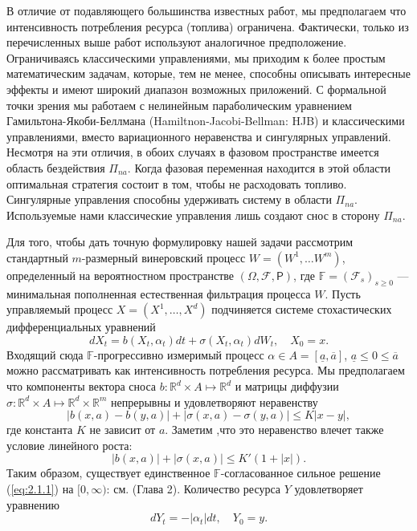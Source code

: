 В отличие от подавляющего большинства известных работ, мы предполагаем что интенсивность потребления ресурса (топлива) ограничена. Фактически, только \cite{PemZhaYin07,BiaWuZhe14} из перечисленных выше работ используют аналогичное предположение. Ограничиваясь классическими управлениями, мы приходим к более простым математическим задачам, которые, тем не менее, способны описывать интересные эффекты и имеют широкий диапазон возможных приложений. С формальной точки зрения мы работаем с нелинейным параболическим уравнением Гамильтона-Якоби-Беллмана (Hamiltnon-Jacobi-Bellman: HJB) и классическими управлениями, вместо вариационного неравенства и сингулярных управлений. Несмотря на эти отличия, в обоих случаях в фазовом пространстве имеется область бездействия $\Pi_{na}$. Когда фазовая переменная находится в этой области оптимальная стратегия состоит в том, чтобы не расходовать топливо. Сингулярные управления способны удерживать систему в области $\Pi_{na}$. Используемые нами классические управления лишь создают снос в сторону $\Pi_{na}$.

Для того, чтобы дать точную формулировку нашей задачи рассмотрим стандартный $m$-размерный винеровский процесс  $W=(W^1,\dots W^m)$, определенный на вероятностном пространстве $(\Omega,\mathcal F,\mathsf P)$, где $\mathbb F=(\mathscr F_s)_{s\ge 0}$ --- минимальная пополненная естественная фильтрация процесса $W$. Пусть управляемый процесс $X=(X^1,\dots,X^d)$ подчиняется системе стохастических дифференциальных уравнений
\begin{equation} \label{eq:2.1.1}
dX_t=b(X_t,\alpha_t) dt+\sigma(X_t,\alpha_t) dW_t, \quad X_0=x.
\end{equation}
Входящий сюда $\mathbb F$-прогрессивно измеримый процесс $\alpha \in A=[\underline a, \overline a]$, $\underline a\le 0\le \overline a$ можно рассматривать как интенсивность потребления ресурса. Мы предполагаем что компоненты вектора сноса $b:\mathbb R^d\times A\mapsto\mathbb R^d$ и матрицы диффузии $\sigma:\mathbb R^d\times A\mapsto\mathbb R^d\times\mathbb R^m$ непрерывны и удовлетворяют неравенству
$$|b(x,a)-b(y,a)|+|\sigma(x,a)-\sigma(y,a)|\le K|x-y|,$$
где константа $K$ не зависит от $a$. Заметим ,что это неравенство влечет также условие линейного роста:
$$ |b(x,a)|+|\sigma(x,a)|\le K'(1+|x|).$$
Таким образом, существует единственное $\mathbb F$-согласованное сильное решение (\ref{eq:2.1.1}) на $[0,\infty)$: см. \cite{Kry80} (Глава 2). Количество ресурса $Y$ удовлетворяет уравнению
\begin{equation} \label{eq:2.1.2}
dY_t=-|\alpha_t|dt,\quad Y_0=y.
\end{equation}

